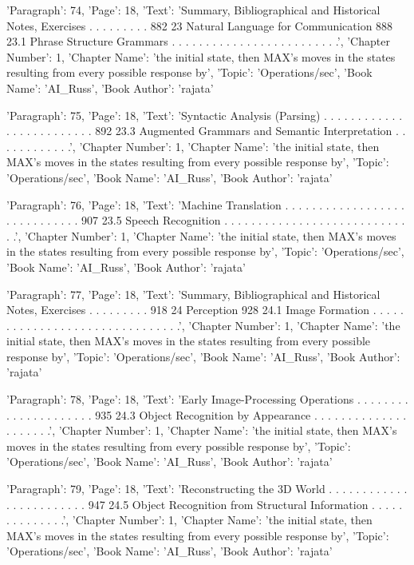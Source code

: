 {'Paragraph': 74, 'Page': 18, 'Text': 'Summary, Bibliographical and Historical Notes, Exercises . . . . . . . . . 882 23 Natural Language for Communication 888 23.1 Phrase Structure Grammars . . . . . . . . . . . . . . . . . . . . . . . . .', 'Chapter Number': 1, 'Chapter Name': 'the initial state, then MAX’s moves in the states resulting from every possible response by', 'Topic': 'Operations/sec', 'Book Name': 'AI_Russ', 'Book Author': 'rajata'}

{'Paragraph': 75, 'Page': 18, 'Text': 'Syntactic Analysis (Parsing) . . . . . . . . . . . . . . . . . . . . . . . . . 892 23.3 Augmented Grammars and Semantic Interpretation . . . . . . . . . . . .', 'Chapter Number': 1, 'Chapter Name': 'the initial state, then MAX’s moves in the states resulting from every possible response by', 'Topic': 'Operations/sec', 'Book Name': 'AI_Russ', 'Book Author': 'rajata'}

{'Paragraph': 76, 'Page': 18, 'Text': 'Machine Translation . . . . . . . . . . . . . . . . . . . . . . . . . . . . . 907 23.5 Speech Recognition . . . . . . . . . . . . . . . . . . . . . . . . . . . . .', 'Chapter Number': 1, 'Chapter Name': 'the initial state, then MAX’s moves in the states resulting from every possible response by', 'Topic': 'Operations/sec', 'Book Name': 'AI_Russ', 'Book Author': 'rajata'}

{'Paragraph': 77, 'Page': 18, 'Text': 'Summary, Bibliographical and Historical Notes, Exercises . . . . . . . . . 918 24 Perception 928 24.1 Image Formation . . . . . . . . . . . . . . . . . . . . . . . . . . . . . . .', 'Chapter Number': 1, 'Chapter Name': 'the initial state, then MAX’s moves in the states resulting from every possible response by', 'Topic': 'Operations/sec', 'Book Name': 'AI_Russ', 'Book Author': 'rajata'}

{'Paragraph': 78, 'Page': 18, 'Text': 'Early Image-Processing Operations . . . . . . . . . . . . . . . . . . . . . 935 24.3 Object Recognition by Appearance . . . . . . . . . . . . . . . . . . . . .', 'Chapter Number': 1, 'Chapter Name': 'the initial state, then MAX’s moves in the states resulting from every possible response by', 'Topic': 'Operations/sec', 'Book Name': 'AI_Russ', 'Book Author': 'rajata'}

{'Paragraph': 79, 'Page': 18, 'Text': 'Reconstructing the 3D World . . . . . . . . . . . . . . . . . . . . . . . . 947 24.5 Object Recognition from Structural Information . . . . . . . . . . . . . .', 'Chapter Number': 1, 'Chapter Name': 'the initial state, then MAX’s moves in the states resulting from every possible response by', 'Topic': 'Operations/sec', 'Book Name': 'AI_Russ', 'Book Author': 'rajata'}

